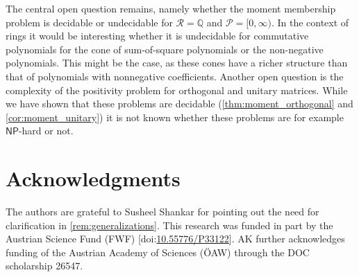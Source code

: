 \documentclass[11pt]{article}
\theoremstyle{definition}
\newcommand{\NP}{\mathsf{NP}}
\begin{document}
The central open question remains, namely whether the moment membership problem is decidable or undecidable for $\mathcal{R} = \mathbb{Q}$ and $\mathcal{P} = [0, \infty)$. In the context of rings it would be interesting whether it is undecidable for commutative polynomials for the cone of sum-of-square polynomials or the non-negative polynomials. This might be the case, as these cones have a richer structure than that of polynomials with nonnegative coefficients. Another open question is the complexity of the positivity problem for orthogonal and unitary matrices. While we have shown that these problems are decidable (\cref{thm:moment_orthogonal} and \cref{cor:moment_unitary}) it is not known whether these problems are for example $\NP$-hard or not.


\section{Acknowledgments} The authors are grateful to Susheel Shankar for pointing out the need for clarification in \cref{rem:generalizations}. This research was funded in part by the Austrian Science Fund (FWF) [doi:\href{https://www.doi.org/10.55776/P33122}{10.55776/P33122}]. AK further acknowledges funding of the Austrian Academy of Sciences (\"OAW) through the DOC scholarship 26547.



\end{document}
